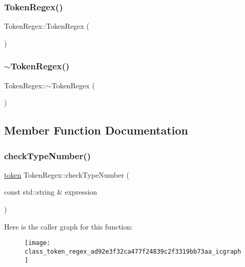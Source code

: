 \subsubsection{\texorpdfstring{TokenRegex()}{TokenRegex()}}
{\footnotesize\ttfamily Token\+Regex\+::\+Token\+Regex (\begin{DoxyParamCaption}{ }\end{DoxyParamCaption})}

\mbox{\label{class_token_regex_a2d1a4196e06e8bc43e389a05e63e53c5}} 
\subsubsection{\texorpdfstring{$\sim$TokenRegex()}{~TokenRegex()}}
{\footnotesize\ttfamily Token\+Regex\+::$\sim$\+Token\+Regex (\begin{DoxyParamCaption}{ }\end{DoxyParamCaption})}



\subsection{Member Function Documentation}
\mbox{\label{class_token_regex_ad92e3f32ca477f24839c2f3319bb73aa}} 
\subsubsection{\texorpdfstring{checkTypeNumber()}{checkTypeNumber()}}
{\footnotesize\ttfamily \mbox{\hyperlink{structtoken}{token}} Token\+Regex\+::check\+Type\+Number (\begin{DoxyParamCaption}\item[{const std\+::string \&}]{expression }\end{DoxyParamCaption})}

Here is the caller graph for this function\+:
\nopagebreak
\begin{figure}[H]
\begin{center}
\leavevmode
\texttt{[image: class\_token\_regex\_ad92e3f32ca477f24839c2f3319bb73aa\_icgraph]}
\end{center}
\end{figure}
\mbox{\label{class_token_regex_a246e8bd4f285ff2cc7407c9d489c8d37}} 
